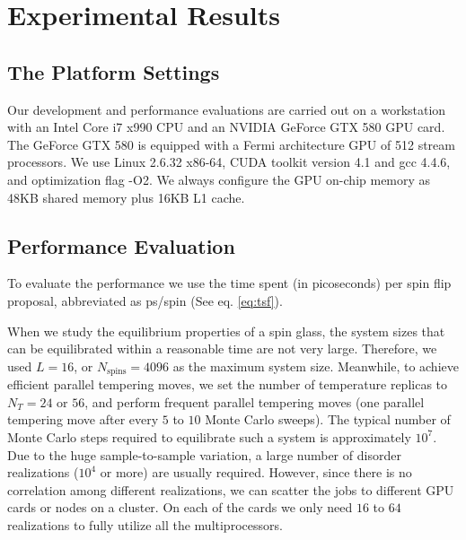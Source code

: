 \section{Experimental Results}
\label{section_exp}

\subsection{The Platform Settings}
\label{section_platform}

Our development and performance evaluations are carried out on a
workstation with an Intel Core i7 x990 CPU and an NVIDIA GeForce GTX
580 GPU card. The GeForce GTX 580 is equipped with a Fermi architecture
GPU of 512 stream processors. We use Linux 2.6.32 x86-64, CUDA toolkit version 4.1
and gcc 4.4.6, and optimization flag -O2. We always configure the
GPU on-chip memory as 48KB shared memory plus 16KB L1 cache.

 
\subsection{Performance Evaluation}
\label{section_compare}
To evaluate the performance we use the time spent (in picoseconds) per spin flip proposal,
abbreviated as ps/spin (See eq. \ref{eq:tsf}).

When we study the equilibrium properties of a spin glass, the system
sizes that can be equilibrated within a reasonable time are not very
large. Therefore, we used $L=16$, or $N_\mathrm{spins}=4096$ as the
maximum system size. Meanwhile, to achieve efficient parallel
tempering moves, we set the number of temperature replicas to $N_T=24$ or $56$, 
and perform frequent parallel tempering moves (one parallel tempering move after
every $5$ to $10$ Monte Carlo sweeps). The typical number of Monte
Carlo steps required to equilibrate such a system is approximately
$10^7$.  Due to the huge sample-to-sample variation, a large number of
disorder realizations ($10^4$ or more) are usually required. However, since there is no
correlation among different realizations, we can scatter the jobs to
different GPU cards or nodes on a cluster.  On each of the cards we
only need $16$ to $64$ realizations to fully utilize all the
multiprocessors.

